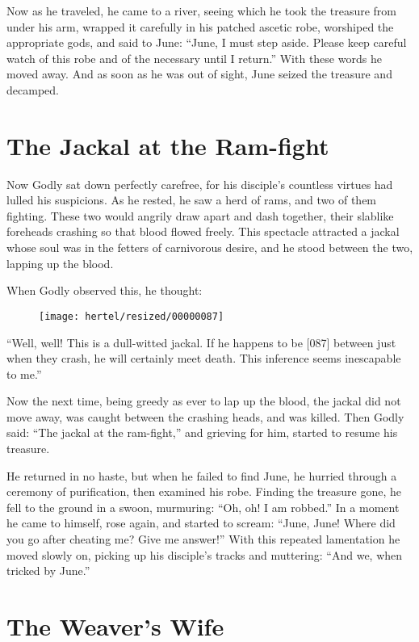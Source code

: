 \documentclass[article, twoside, 10pt]{memoir}
\begin{document}
Now as he traveled, he came to a river, seeing which he took the
treasure from under his arm, wrapped it carefully in his patched
ascetic robe, worshiped the appropriate gods, and said to June:
``June, I must step aside. Please keep careful watch of this robe and of the necessary until I return.''
With these words he moved away. And as soon as he was out of sight,
June seized the treasure and decamped.

\chapter{The Jackal at the Ram-fight}

Now Godly sat down perfectly carefree, for his disciple's countless
virtues had lulled his suspicions. As he rested, he saw a herd of
rams, and two of them fighting. These two would angrily draw apart
and dash together, their slablike foreheads crashing so that blood
flowed freely. This spectacle attracted a jackal whose soul was in
the fetters of carnivorous desire, and he stood between the two,
lapping up the blood.

When Godly observed this, he thought:
\begin{figure}[p]\texttt{[image: hertel/resized/00000087]}\end{figure}``Well, well! This is a dull-witted jackal. If he happens to be [087] between just when they crash, he will certainly meet death. This inference seems inescapable to me.''

Now the next time, being greedy as ever to lap up the blood, the
jackal did not move away, was caught between the crashing heads,
and was killed. Then Godly said: ``The jackal at the ram-fight,''
and grieving for him, started to resume his treasure.

He returned in no haste, but when he failed to find June, he
hurried through a ceremony of purification, then examined his robe.
Finding the treasure gone, he fell to the ground in a swoon,
murmuring: ``Oh, oh! I am robbed.'' In a moment he came to himself,
rose again, and started to scream:
``June, June! Where did you go after cheating me? Give me answer!''
With this repeated lamentation he moved slowly on, picking up his
disciple's tracks and muttering: ``And we, when tricked by June.''

\chapter{The Weaver's Wife}
\end{document}

